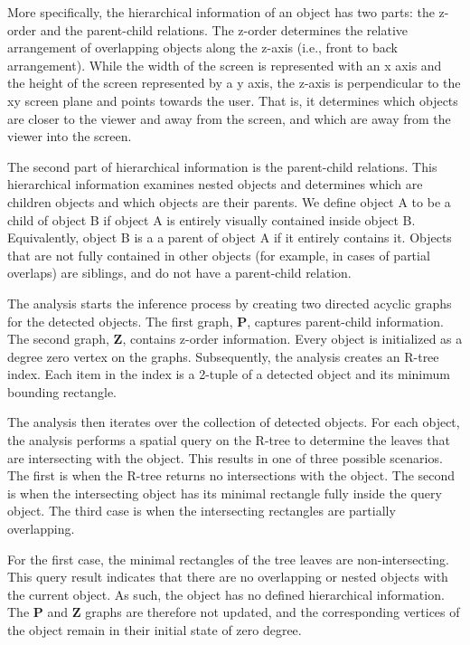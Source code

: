 More specifically, the hierarchical information of an object has two parts: the z-order and the parent-child relations. 
The z-order determines the relative arrangement of overlapping objects along the z-axis (i.e., front to back arrangement). While the width of the screen is represented with an x axis and the height of the screen represented by a y axis, the z-axis is perpendicular to the xy screen plane and points towards the user. That is, it determines which objects are closer to the viewer and away from the screen, and which are away from the viewer into the screen. 

The second part of hierarchical information is the parent-child relations.
This hierarchical information examines nested objects and determines which are children objects and which objects are their parents.
We define object A to be a child of object B if object A is entirely visually contained inside object B.
Equivalently, object B is a a parent of object A if it entirely contains it.
Objects that are not fully contained in other objects (for example, in cases of partial overlaps) are siblings, and do not have a parent-child relation.

The analysis starts the inference process by creating two directed acyclic graphs for the detected objects.
The first graph, $\mathbf{P}$, captures parent-child information.
The second graph, $\mathbf{Z}$, contains z-order information.
Every object is initialized as a degree zero vertex on the graphs.
Subsequently, the analysis creates an R-tree index. Each item in the index is a 2-tuple of a detected object and its minimum bounding rectangle. 

The analysis then iterates over the collection of detected objects.
For each object, the analysis performs a spatial query on the R-tree to determine the leaves that are intersecting with the object.
This results in one of three possible scenarios.
The first is when the R-tree returns no intersections with the object.
The second is when the intersecting object has its minimal rectangle fully inside the query object.
The third case is when the intersecting rectangles are partially overlapping.

For the first case, the minimal rectangles of the tree leaves are non-intersecting.
This query result indicates that there are no overlapping or nested objects with the current object.
As such, the object has no defined hierarchical information.
The $\mathbf{P}$ and $\mathbf{Z}$ graphs are therefore not updated, and the corresponding vertices of the object remain in their initial state of zero degree.

